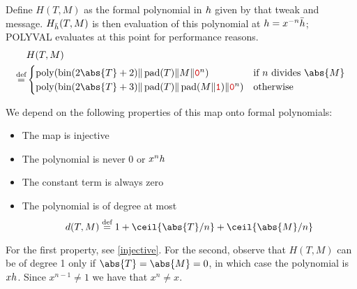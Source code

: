 \documentclass[hctr2.tex]{subfiles}
\begin{document}
Define \(H(T, M)\) as the formal polynomial in \(h\) given
by that tweak and message.
\(H_{\bar{h}}(T, M)\) is then evaluation of this polynomial at
\(h = x^{-n}\bar{h}\); POLYVAL evaluates at this point for
performance reasons.
\begin{align*}
    & H(T, M) \\
    \defeq &
    \begin{cases}
        \poly(\fromint(2\abs{T} + 2) \Concat \pad(T) \Concat M \Concat \bino^n) &
        \text{if } n \text{ divides } \abs{M} \\
        \poly(\fromint(2\abs{T} + 3) \Concat \pad(T) \Concat \pad(M \Concat \bini) \Concat \bino^n) &
        \text{otherwise}
    \end{cases}
\end{align*}

We depend on the following properties of this map 
onto formal polynomials:
\begin{itemize}
    \item The map is injective
    \item The polynomial is never \(0\) or \(x^nh\)
    \item The constant term is always zero
    \item The polynomial is of degree at most
    \begin{displaymath}
        d(T, M) \defeq 1 + \ceil{\abs{T}/n} + \ceil{\abs{M}/n}
    \end{displaymath}
\end{itemize}

For the first property, see \autoref{injective}.
For the second, observe that \(H(T, M)\)
can be of degree 1 only if \(\abs{T} = \abs{M} = 0\),
in which case the polynomial is \(xh\).
Since \(x^{n-1} \neq 1\) we have that \(x^n \neq x\).
\end{document}
